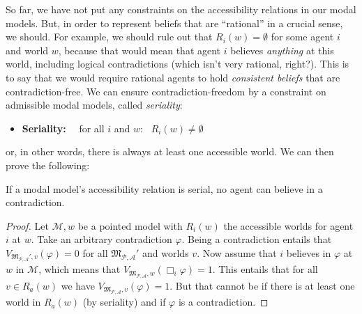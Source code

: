 \documentclass[nobib,nofonts]{tufte-handout}
\newcommand{\Model}{\ensuremath{\mathcal{M}}}
\newcommand{\Models}{\ensuremath{\mathfrak{M}_{\mathcal{P},\mathcal{A}}}}
\begin{document}
So far, we have not put any constraints on the accessibility relations in our modal models.
But, in order to represent beliefs that are ``rational'' in a crucial sense, we should.
For example, we should rule out that $R_{i}(w) = \emptyset$ for some agent $i$ and world $w$, because that would mean that agent $i$ believes \emph{anything} at this world, including logical contradictions (which isn't very rational, right?).
This is to say that we would require rational agents to hold \emph{consistent beliefs} that are contradiction-free.
We can ensure contradiction-freedom by a constraint on admissible modal models, called \emph{seriality}:
\begin{itemize}[]
  \item \textbf{Seriality:} \ \  for all $i$ and $w$: \ $R_{i}(w) \neq \emptyset$
\end{itemize}
or, in other words, there is always at least one accessible world.
We can then prove the following:

\begin{claim}
  If a modal model's accessibility relation is serial, no agent can believe in a contradiction.
\end{claim}
\begin{proof}
  Let $\Model, w$ be a pointed model with $R_{i}(w)$ the accessible worlds for agent $i$ at $w$.
  Take an arbitrary contradiction $\varphi$.
  Being a contradiction entails that $V_{\Models', v}(\varphi) = 0$ for all $\Models'$ and worlds $v$.
  Now assume that $i$ believes in $\varphi$ at $w$ in $\Model$, which means that $V_{\Models, w}(\Box_{i}\varphi)=1$.
  This entails that for all $v \in R_{a}(w)$ we have $V_{\Models, v}(\varphi) = 1$.
  But that cannot be if there is at least one world in $R_{a}(w)$ (by seriality) and if $\varphi$ is a contradiction.
\end{proof}
\end{document}
